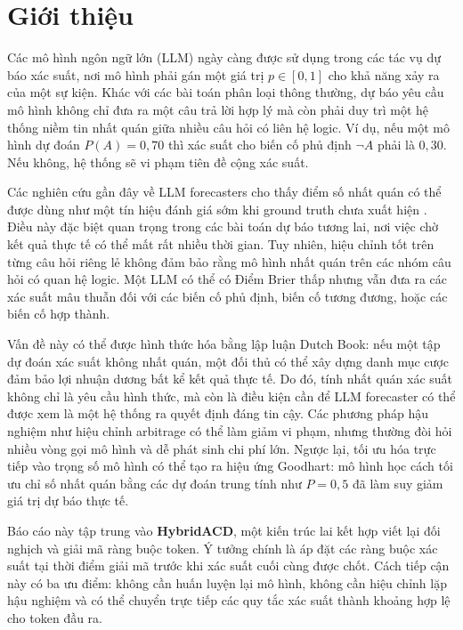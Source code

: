 \documentclass[pdflatex,sn-mathphys-num,oneside]{sn-jnl}
\begin{document}
\section{Giới thiệu}\label{sec:intro}

Các mô hình ngôn ngữ lớn (LLM) ngày càng được sử dụng trong các tác vụ dự báo xác suất, nơi mô hình phải gán một giá trị $p \in [0,1]$ cho khả năng xảy ra của một sự kiện. Khác với các bài toán phân loại thông thường, dự báo yêu cầu mô hình không chỉ đưa ra một câu trả lời hợp lý mà còn phải duy trì một hệ thống niềm tin nhất quán giữa nhiều câu hỏi có liên hệ logic. Ví dụ, nếu một mô hình dự đoán $P(A)=0,70$ thì xác suất cho biến cố phủ định $\neg A$ phải là $0,30$. Nếu không, hệ thống sẽ vi phạm tiên đề cộng xác suất.

Các nghiên cứu gần đây về LLM forecasters cho thấy điểm số nhất quán có thể được dùng như một tín hiệu đánh giá sớm khi ground truth chưa xuất hiện \cite{ref1}. Điều này đặc biệt quan trọng trong các bài toán dự báo tương lai, nơi việc chờ kết quả thực tế có thể mất rất nhiều thời gian. Tuy nhiên, hiệu chỉnh tốt trên từng câu hỏi riêng lẻ không đảm bảo rằng mô hình nhất quán trên các nhóm câu hỏi có quan hệ logic. Một LLM có thể có Điểm Brier thấp nhưng vẫn đưa ra các xác suất mâu thuẫn đối với các biến cố phủ định, biến cố tương đương, hoặc các biến cố hợp thành.

Vấn đề này có thể được hình thức hóa bằng lập luận Dutch Book: nếu một tập dự đoán xác suất không nhất quán, một đối thủ có thể xây dựng danh mục cược đảm bảo lợi nhuận dương bất kể kết quả thực tế. Do đó, tính nhất quán xác suất không chỉ là yêu cầu hình thức, mà còn là điều kiện cần để LLM forecaster có thể được xem là một hệ thống ra quyết định đáng tin cậy. Các phương pháp hậu nghiệm như hiệu chỉnh arbitrage có thể làm giảm vi phạm, nhưng thường đòi hỏi nhiều vòng gọi mô hình và dễ phát sinh chi phí lớn. Ngược lại, tối ưu hóa trực tiếp vào trọng số mô hình có thể tạo ra hiệu ứng Goodhart: mô hình học cách tối ưu chỉ số nhất quán bằng các dự đoán trung tính như $P=0,5$ đã làm suy giảm giá trị dự báo thực tế.

Báo cáo này tập trung vào \textbf{HybridACD}, một kiến trúc lai kết hợp viết lại đối nghịch và giải mã ràng buộc token. Ý tưởng chính là áp đặt các ràng buộc xác suất tại thời điểm giải mã trước khi xác suất cuối cùng được chốt. Cách tiếp cận này có ba ưu điểm: không cần huấn luyện lại mô hình, không cần hiệu chỉnh lặp hậu nghiệm và có thể chuyển trực tiếp các quy tắc xác suất thành khoảng hợp lệ cho token đầu ra.
\end{document}
